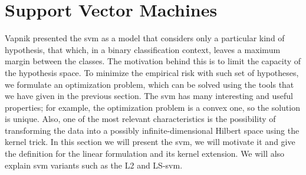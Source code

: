 \section{Support Vector Machines}\label{sec:ch2_svms}
Vapnik presented the \acrshort{svm} as a model that considers only a particular kind of hypothesis, that which, in a binary classification context, leaves a maximum margin between the classes. The motivation behind this is to limit the capacity of the hypothesis space. To minimize the empirical risk with such set of hypotheses, we formulate an optimization problem, which can be solved using the tools that we have given in the previous section. The \acrshort{svm} has many interesting and useful properties; for example, the optimization problem is a convex one, so the solution is unique. Also, one of the most relevant characteristics is the possibility of transforming the data into a possibly infinite-dimensional Hilbert space using the kernel trick.
In this section we will present the \acrshort{svm}, we will motivate it and give the definition for the linear formulation and its kernel extension. We will also explain \acrshort{svm} variants such as the L2 and LS-\acrshort{svm}.

